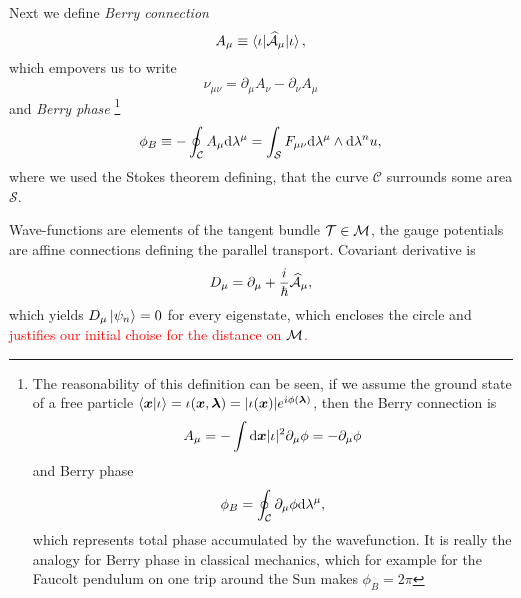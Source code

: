 Next we define \emph{Berry connection}
\begin{equation}
    A_\mu\equiv \braket{\iota|\AA_\mu|\iota},
\end{equation}
which empovers us to write
\begin{equation}
    \nu_{\mu\nu} = \partial_\mu A_\nu-\partial_\nu A_\mu
\end{equation}
and \emph{Berry phase}
    \footnote{
        The reasonability of this definition can be seen, if we assume the ground state of a free particle
            $\braket{\bm{x}|\iota}=\iota(\bm{x},\llambda)= |\iota(\bm{x})|e^{i\phi(\llambda)}$,
        then the Berry connection is
        \begin{equation}
            A_\mu=-\int \d \bm{x}|\iota|^2\partial_\mu \phi = -\partial_\mu \phi
        \end{equation} 
        and Berry phase
        \begin{equation}
            \phi_B=\oint_\mathcal{C} \partial_\mu \phi \d \lambda^\mu,
        \end{equation}
        which represents total phase accumulated by the wavefunction. It is really the analogy for Berry phase in classical mechanics, which for example for the Faucolt pendulum on one trip around the Sun makes $\phi_B=2\pi$
    }
\begin{equation}
    \phi_B\equiv-\oint_\mathcal{C} A_\mu \d \lambda^\mu=\int_\mathcal{S} F_{\mu\nu}\d \lambda^\mu \wedge \d\lambda^nu,
\end{equation}
where we used the Stokes theorem defining, that the curve $\mathcal{C}$ surrounds some area $\mathcal{S}$.

Wave-functions are elements of the tangent bundle $\TT\in \M$, the gauge potentials are affine connections defining the parallel transport. Covariant derivative is
\begin{equation}
    D_\mu=\partial_\mu+\frac{i}{\hbar}\AA_\mu,
\end{equation}
which yields $D_\mu\ket{\psi_n}=0$ for every eigenstate, which encloses the circle and \textcolor{red}{justifies our initial choise for the distance on $\M$.}